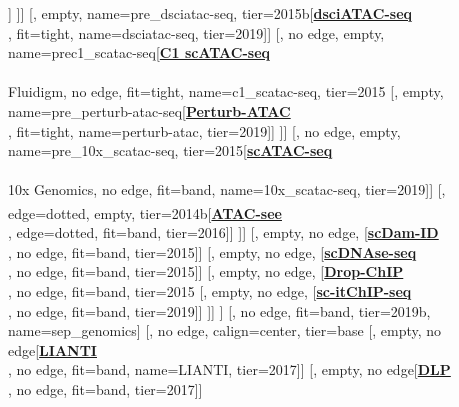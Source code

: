 \documentclass[12pt, a4]{article}
\begin{document}
\begin{center}
\begin{forest}
			[, empty, edge=dotted[\href{https://www.nature.com/articles/s41593-018-0079-3}{\textbf{snATAC-seq}}\\\citealt{preissl2018}, edge=dotted, fit=tight, name=scnatac-seq, tier=2018]]
		]]
		[, empty, name=pre_dsciatac-seq, tier=2015b[\href{https://www.nature.com/articles/s41587-019-0147-6}{\textbf{dsciATAC-seq}}\\\citealt{lareau2019}, fit=tight, name=dsciatac-seq, tier=2019]]
		[, no edge, empty, name=prec1_scatac-seq[\href{https://www.nature.com/articles/nature14590}{\textbf{C1 scATAC-seq}}\\\citealt{buenrostro2015}\\Fluidigm, no edge, fit=tight, name=c1_scatac-seq, tier=2015
			[, empty, name=pre_perturb-atac-seq[\href{https://www.nature.com/articles/nature14590}{\textbf{Perturb-ATAC}}\\\citealt{rubin2019}, fit=tight, name=perturb-atac, tier=2019]]
		]]
		[, no edge, empty, name=pre_10x_scatac-seq, tier=2015[\href{https://www.nature.com/articles/s41587-019-0206-z}{\textbf{scATAC-seq}}\\\citealt{satpathy2019}\\10x Genomics, no edge, fit=band, name=10x_scatac-seq, tier=2019]]
		[, edge=dotted, empty, tier=2014b[\href{https://www.nature.com/articles/nmeth.4031}{\textbf{ATAC-see\textsuperscript{\large{\textmu}}}}\\\citealt{chen2016}, edge=dotted, fit=band, tier=2016]]
	]]
	[, empty, no edge, [\href{https://www.sciencedirect.com/science/article/pii/S0092867415010922}{\textbf{scDam-ID}}\\\citealt{kind2015}, no edge, fit=band, tier=2015]]
	[, empty, no edge, [\href{https://www.nature.com/articles/nature15740}{\textbf{scDNAse-seq}}\\\citealt{jin2015}, no edge, fit=band, tier=2015]]
	[, empty, no edge, [\href{https://www.nature.com/articles/nbt.3383}{\textbf{Drop-ChIP}}\\\citealt{rotem2015}, no edge, fit=band, tier=2015
		[, empty, no edge, [\href{https://www.nature.com/articles/s41556-019-0383-5}{\textbf{sc-itChIP-seq}}\\\citealt{ai2019}, no edge, fit=band, tier=2019]]
	]]
]
[, no edge, fit=band, tier=2019b, name=sep_genomics]
[, no edge, calign=center, tier=base
	[, empty, no edge[\href{https://science.sciencemag.org/content/356/6334/189}{\textbf{LIANTI}}\\\citealt{chen2017}, no edge, fit=band, name=LIANTI, tier=2017]]
	[, empty, no edge[\href{https://www.nature.com/articles/nmeth.4140}{\textbf{DLP}}\\\citealt{zahn2017}, no edge, fit=band, tier=2017]]

\end{forest}
\end{center}
\end{document}
